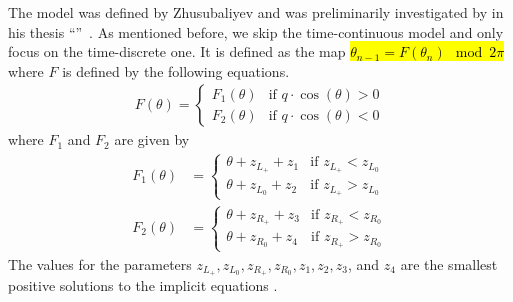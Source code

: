 The model was defined by Zhusubaliyev and was preliminarily investigated by  in his thesis ``''~\cite{akyuz2022}.
As mentioned before, we skip the time-continuous model and only focus on the time-discrete one.
It is defined as the map \hl{$\theta_{n-1} = F(\theta_n) \mod 2 \pi$} where $F$ is defined by the following equations.
\begin{align}
	F(\theta) = \begin{cases}
		            F_1(\theta) & \text{if } q \cdot \cos(\theta) > 0 \\
		            F_2(\theta) & \text{if } q \cdot \cos(\theta) < 0
	            \end{cases}
\end{align}
where $F_1$ and $F_2$ are given by
\begin{subequations}
	\begin{align}
		F_1(\theta) & = \begin{cases}
			                \theta + z_{L_+} + z_1 & \text{if } z_{L_+} < z_{L_0} \\
			                \theta + z_{L_0} + z_2 & \text{if } z_{L_+} > z_{L_0}
		                \end{cases} \\
		F_2(\theta) & = \begin{cases}
			                \theta + z_{R_+} + z_3 & \text{if } z_{R_+} < z_{R_0} \\
			                \theta + z_{R_0} + z_4 & \text{if } z_{R_+} > z_{R_0}
		                \end{cases}
	\end{align}
\end{subequations}
The values for the parameters $z_{L_+}, z_{L_0}, z_{R_+}, z_{R_0}, z_1, z_2, z_3$, and $z_4$ are the smallest positive solutions to the implicit equations .

